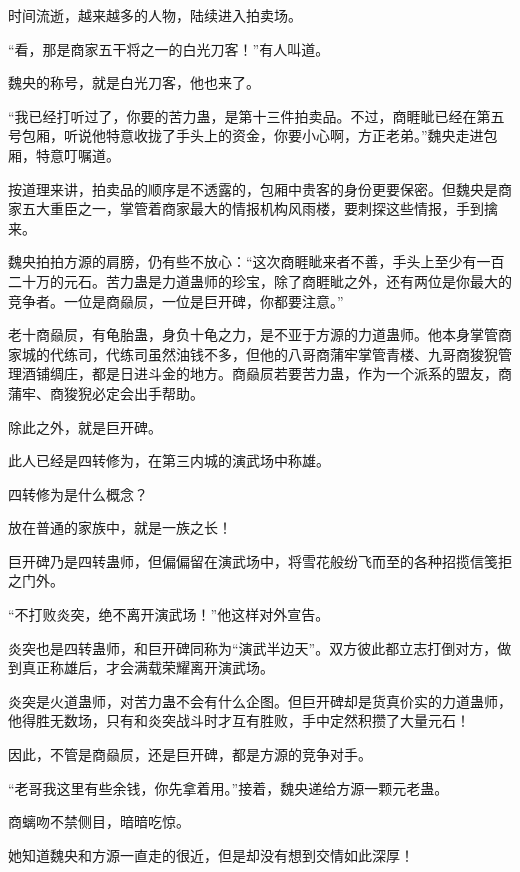 
\begin{this_body}



时间流逝，越来越多的人物，陆续进入拍卖场。

“看，那是商家五干将之一的白光刀客！”有人叫道。

魏央的称号，就是白光刀客，他也来了。

“我已经打听过了，你要的苦力蛊，是第十三件拍卖品。不过，商睚眦已经在第五号包厢，听说他特意收拢了手头上的资金，你要小心啊，方正老弟。”魏央走进包厢，特意叮嘱道。

按道理来讲，拍卖品的顺序是不透露的，包厢中贵客的身份更要保密。但魏央是商家五大重臣之一，掌管着商家最大的情报机构风雨楼，要刺探这些情报，手到擒来。

魏央拍拍方源的肩膀，仍有些不放心：“这次商睚眦来者不善，手头上至少有一百二十万的元石。苦力蛊是力道蛊师的珍宝，除了商睚眦之外，还有两位是你最大的竞争者。一位是商赑屃，一位是巨开碑，你都要注意。”

老十商赑屃，有龟胎蛊，身负十龟之力，是不亚于方源的力道蛊师。他本身掌管商家城的代练司，代练司虽然油钱不多，但他的八哥商蒲牢掌管青楼、九哥商狻猊管理酒铺绸庄，都是日进斗金的地方。商赑屃若要苦力蛊，作为一个派系的盟友，商蒲牢、商狻猊必定会出手帮助。

除此之外，就是巨开碑。

此人已经是四转修为，在第三内城的演武场中称雄。

四转修为是什么概念？

放在普通的家族中，就是一族之长！

巨开碑乃是四转蛊师，但偏偏留在演武场中，将雪花般纷飞而至的各种招揽信笺拒之门外。

“不打败炎突，绝不离开演武场！”他这样对外宣告。

炎突也是四转蛊师，和巨开碑同称为“演武半边天”。双方彼此都立志打倒对方，做到真正称雄后，才会满载荣耀离开演武场。

炎突是火道蛊师，对苦力蛊不会有什么企图。但巨开碑却是货真价实的力道蛊师，他得胜无数场，只有和炎突战斗时才互有胜败，手中定然积攒了大量元石！

因此，不管是商赑屃，还是巨开碑，都是方源的竞争对手。

“老哥我这里有些余钱，你先拿着用。”接着，魏央递给方源一颗元老蛊。

商螭吻不禁侧目，暗暗吃惊。

她知道魏央和方源一直走的很近，但是却没有想到交情如此深厚！


\end{this_body}
